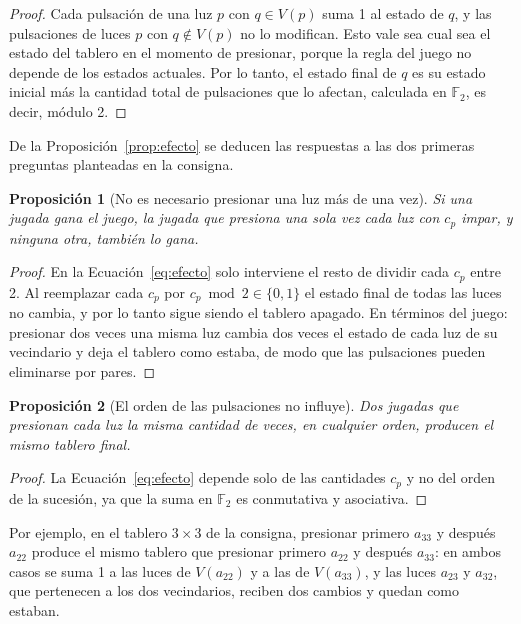 \documentclass[12pt,a4paper]{article}
\theoremstyle{plain}
\newtheorem{proposicion}{Proposición}
\theoremstyle{definition}
\theoremstyle{remark}
\newcommand{\F}{\mathbb{F}_2}
\newcommand{\V}{V}
\begin{document}
\begin{proof}
Cada pulsación de una luz $p$ con $q\in\V(p)$ suma 1 al estado de $q$, y las pulsaciones de luces $p$ con $q\notin\V(p)$ no lo modifican. Esto vale sea cual sea el estado del tablero en el momento de presionar, porque la regla del juego no depende de los estados actuales. Por lo tanto, el estado final de $q$ es su estado inicial más la cantidad total de pulsaciones que lo afectan, calculada en $\F$, es decir, módulo 2.
\end{proof}

De la Proposición~\ref{prop:efecto} se deducen las respuestas a las dos primeras preguntas planteadas en la consigna.

\begin{proposicion}[No es necesario presionar una luz más de una vez]\label{prop:repeticion}
Si una jugada gana el juego, la jugada que presiona una sola vez cada luz con $c_p$ impar, y ninguna otra, también lo gana.
\end{proposicion}

\begin{proof}
En la Ecuación~\eqref{eq:efecto} solo interviene el resto de dividir cada $c_p$ entre 2. Al reemplazar cada $c_p$ por $c_p \bmod 2\in\{0,1\}$ el estado final de todas las luces no cambia, y por lo tanto sigue siendo el tablero apagado. En términos del juego: presionar dos veces una misma luz cambia dos veces el estado de cada luz de su vecindario y deja el tablero como estaba, de modo que las pulsaciones pueden eliminarse por pares.
\end{proof}

\begin{proposicion}[El orden de las pulsaciones no influye]\label{prop:orden}
Dos jugadas que presionan cada luz la misma cantidad de veces, en cualquier orden, producen el mismo tablero final.
\end{proposicion}

\begin{proof}
La Ecuación~\eqref{eq:efecto} depende solo de las cantidades $c_p$ y no del orden de la sucesión, ya que la suma en $\F$ es conmutativa y asociativa.
\end{proof}

Por ejemplo, en el tablero $3\times 3$ de la consigna, presionar primero $a_{33}$ y después $a_{22}$ produce el mismo tablero que presionar primero $a_{22}$ y después $a_{33}$: en ambos casos se suma 1 a las luces de $\V(a_{22})$ y a las de $\V(a_{33})$, y las luces $a_{23}$ y $a_{32}$, que pertenecen a los dos vecindarios, reciben dos cambios y quedan como estaban.
\end{document}
